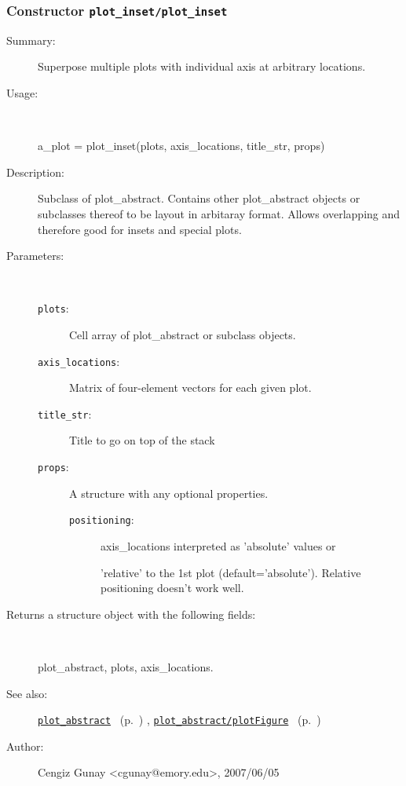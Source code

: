 \subsubsection[Constructor \texttt{plot\_inset}]{Constructor \texttt{plot\_inset/plot\_inset}}%
%
\label{ref_plot_inset__plot_inset}%
\hypertarget{ref_plot_inset__plot_inset}{}%
\begin{description}
\item[Summary:]Superpose multiple plots with individual axis at arbitrary locations.
%
\item[Usage:]~%
\begin{lyxcode}%
a\_plot = plot\_inset(plots, axis\_locations, title\_str, props)
%
\end{lyxcode}%
%
\item[Description:]%
Subclass of plot\_abstract. Contains other plot\_abstract objects or
 subclasses thereof to be layout in arbitaray format. Allows overlapping
 and therefore good for insets and special plots.
\item[Parameters:]~
\begin{description}%
\item[\texttt{plots}:]
 Cell array of plot\_abstract or subclass objects.
\item[\texttt{axis\_locations}:]
 Matrix of four-element vectors for each given plot.
\item[\texttt{title\_str}:]
 Title to go on top of the stack
\item[\texttt{props}:]
 A structure with any optional properties.
\begin{description}%
\item[\texttt{positioning}:]
 axis\_locations interpreted as 'absolute' values or

'relative' to the 1st plot (default='absolute'). 
Relative positioning doesn't work well.
\end{description}%
\end{description}%
%
\item[Returns a structure object with the following fields:
]~

	plot\_abstract, plots, axis\_locations.
%
%
\item[See also:]%
\hyperlink{ref_plot_abstract}{\texttt{plot\_abstract}}%
\ (p.~\pageref{ref_plot_abstract})%
%
, \hyperlink{ref_plot_abstract__plotFigure}{\texttt{plot\_abstract/plotFigure}}%
\ (p.~\pageref{ref_plot_abstract__plotFigure})%
%
%
\item[Author:]%
Cengiz Gunay <cgunay@emory.edu>, 2007/06/05
%
\end{description}
\methodline%
